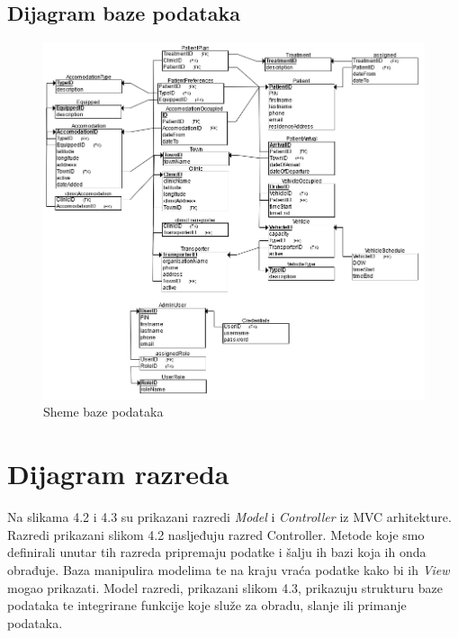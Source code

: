 			\subsection{Dijagram baze podataka}
				\begin{figure}[H]
					\includegraphics[width=\textwidth]{slike/DB_shema.PNG} %
					\caption{Sheme baze podataka}
					\label{fig:db_scheme} %
				\end{figure}
			\eject
			
			
		\section{Dijagram razreda}
		
			Na slikama 4.2 i 4.3 su prikazani razredi \textit{Model} i \textit{Controller} iz MVC arhitekture. Razredi prikazani slikom 4.2 nasljeđuju razred Controller. Metode koje smo definirali unutar tih razreda pripremaju podatke i šalju ih bazi koja ih onda obrađuje. Baza manipulira modelima te na kraju vraća podatke kako bi ih \textit{View} mogao prikazati. Model razredi, prikazani slikom 4.3, prikazuju strukturu baze podataka te integrirane funkcije koje služe za obradu, slanje ili primanje podataka.
			
